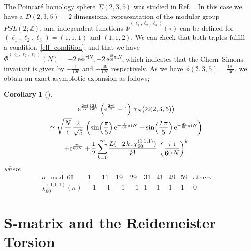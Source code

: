 \documentclass[12pt,reqno]{amsart}
\numberwithin{equation}{section}
\newtheorem{coro}[theorem]{Corollary}
\begin{document}
The Poincar{\'e} homology sphere
$\Sigma(2,3,5)$
was studied in Ref.~.
In this case we have a $D(2,3,5)=2$ dimensional representation of the
modular group $PSL(2;\mathbb{Z})$, and
independent functions
$\widetilde{\Phi}^{(\ell_1,\ell_2,\ell_3)}(\tau)$ can be defined
for
$(\ell_1,\ell_2, \ell_3)=
(1,1,1)$
and $(1,1,2)$.
We can check that  both triples  fulfill a
condition~\eqref{ell_condition}, and that
we have
$\widetilde{\Phi}^{(\ell_1, \ell_2, \ell_3)}(N)
=
  -2 \, \mathrm{e}^{\frac{1}{60} \pi \mathrm{i} N},
  -2 \, \mathrm{e}^{\frac{49}{60} \pi \mathrm{i} N}
$,
which indicates that
the Chern--Simons
invariant is given by
$-\frac{1}{120}$ and $-\frac{49}{120}$ respectively.
As we have $\phi(2,3,5)=\frac{181}{30}$, we obtain an exact asymptotic expansion as follows;
\begin{coro}[\cite{LawrZagi99a}]
  \begin{multline}
    \label{tau_Poincare_limit}
    \mathrm{e}^{
      \frac{2 \pi \mathrm{i}}{N}
      \frac{121}{120}
    } \,
    \left(
      \mathrm{e}^{\frac{2 \pi \mathrm{i}}{N}} - 1
    \right)
    \,    \tau_N \bigl( \Sigma(2,3,5) \bigr)
    \\
    \simeq
    \sqrt{\frac{N}{ \mathrm{i} }} \,
    \frac{2}{\sqrt{5}} \,
    \left(
      \sin \Bigl( \frac{\pi}{5}  \Bigr) \,
      \mathrm{e}^{- \frac{1}{60} \pi \mathrm{i} N}
      +
      \sin \Bigl( \frac{2 \, \pi}{5}  \Bigr) \,
      \mathrm{e}^{- \frac{49}{60} \pi \mathrm{i} N}
    \right)
    \\
    + \mathrm{e}^{\frac{\pi \mathrm{i}}{60 N} }
    +
    \frac{1}{2}
    \sum_{k=0}^\infty
    \frac{L(-2 \, k , \chi_{60}^{(1,1,1)})}{k!} \,
    \left(
      \frac{\pi \, \mathrm{i}}{60 \, N}
    \right)^k  
  \end{multline}
  where
  \begin{equation*}
    \begin{array}{c||ccccccccc}
      n \mod 60 &
      1 & 11 & 19 & 29 & 31 & 41 & 49 & 59 &
      \text{others}
      \\
      \hline
      \chi_{60}^{(1,1,1)}(n)
      & -1 & -1 &-1 & -1 & 1 & 1 & 1 & 1 & 0
    \end{array}
  \end{equation*}
\end{coro}



\section{
  $\mathbf{S}$-matrix and the Reidemeister Torsion}
\label{sec:torsion}
\end{document}
